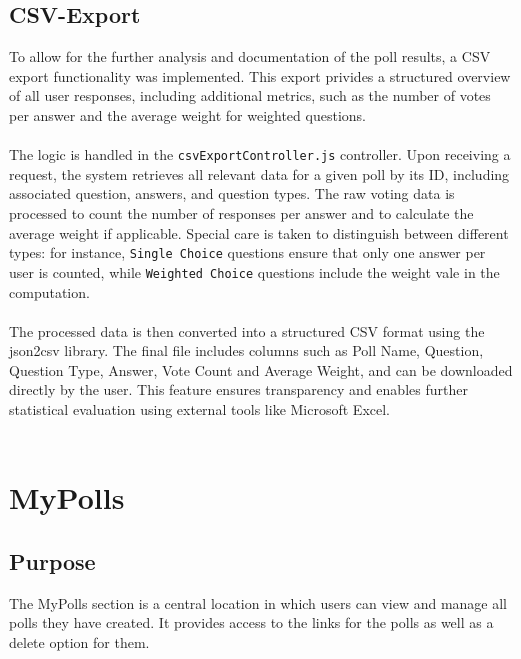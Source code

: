 \documentclass[a4paper,12pt]{report}
\begin{document}
\subsection{CSV-Export}
To allow for the further analysis and documentation of the poll results, a CSV export functionality was implemented. This export privides a structured overview of all user responses, including additional metrics, such as the number of votes per answer and the average weight for weighted questions.\\ \\
The logic is handled in the \texttt{csvExportController.js} controller. Upon receiving a request, the system retrieves all relevant data for a given poll by its ID, including associated question, answers, and question types. The raw voting data is processed to count the number of responses per answer and to calculate the average weight if applicable. Special care is taken to distinguish between different types: for instance, \texttt{Single Choice} questions ensure that only one answer per user is counted, while \texttt{Weighted Choice} questions include the weight vale in the computation.\\ \\
The processed data is then converted into a structured CSV format using the json2csv library. The final file includes columns such as Poll Name, Question, Question Type, Answer, Vote Count and Average Weight, and can be downloaded directly by the user. This feature ensures transparency and enables further statistical evaluation using external tools like Microsoft Excel. \parencite{json2csv} \\ \\

\section{MyPolls}
\subsection{Purpose}
The MyPolls section is a central location in which users can view and manage all polls they have created. It provides access to the links for the polls as well as a delete option for them. \\
\end{document}
